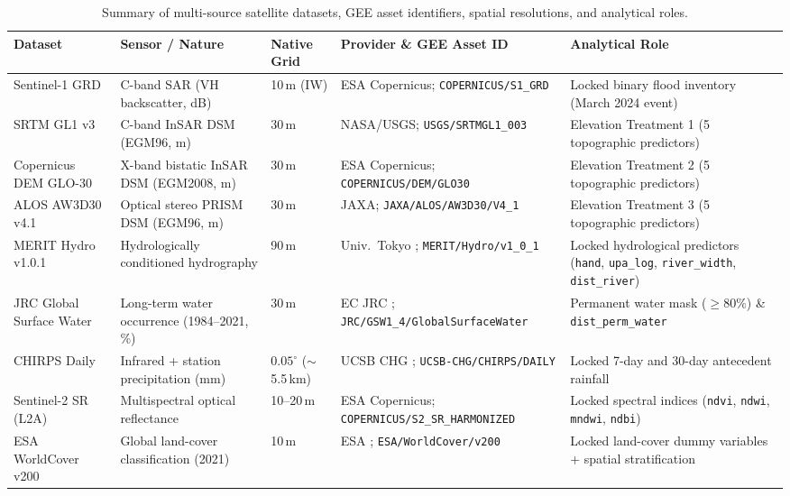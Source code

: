 \documentclass[11pt,twoside]{article}
\begin{document}
\begin{table}[!htbp]
\small
\centering
\caption{Summary of multi-source satellite datasets, GEE asset identifiers, spatial resolutions, and analytical roles.}
\label{tab:data-sources}
\begin{adjustbox}{max width=\textwidth}
\begin{tabular}{>{\raggedright}p{2.7cm} >{\raggedright}p{2.8cm} >{\raggedright}p{1.6cm} >{\raggedright}p{4.3cm} >{\raggedright\arraybackslash}p{3.4cm}}
\toprule
\textbf{Dataset} & \textbf{Sensor / Nature} & \textbf{Native Grid} & \textbf{Provider \& GEE Asset ID} & \textbf{Analytical Role} \\
\midrule
Sentinel-1 GRD & C-band SAR (VH backscatter, dB) & 10\,m (IW) & ESA Copernicus; \texttt{COPERNICUS/\allowbreak S1\_GRD} & Locked binary flood inventory (March 2024 event) \\
SRTM GL1 v3 & C-band InSAR DSM (EGM96, m) & 30\,m & NASA/USGS; \texttt{USGS/\allowbreak SRTMGL1\_003} & Elevation Treatment 1 (5 topographic predictors) \\
Copernicus DEM GLO-30 & X-band bistatic InSAR DSM (EGM2008, m) & 30\,m & ESA Copernicus; \texttt{COPERNICUS/\allowbreak DEM/\allowbreak GLO30} & Elevation Treatment 2 (5 topographic predictors) \\
ALOS AW3D30 v4.1 & Optical stereo PRISM DSM (EGM96, m) & 30\,m & JAXA; \texttt{JAXA/\allowbreak ALOS/\allowbreak AW3D30/\allowbreak V4\_1} & Elevation Treatment 3 (5 topographic predictors) \\
MERIT Hydro v1.0.1 & Hydrologically conditioned hydrography & 90\,m & Univ.\ Tokyo \cite{yamazaki2019}; \texttt{MERIT/\allowbreak Hydro/\allowbreak v1\_0\_1} & Locked hydrological predictors (\texttt{hand}, \texttt{upa\_log}, \texttt{river\_width}, \texttt{dist\_river}) \\
JRC Global Surface Water & Long-term water occurrence (1984--2021, \%) & 30\,m & EC JRC \cite{pekel2016}; \texttt{JRC/\allowbreak GSW1\_4/\allowbreak Global\allowbreak SurfaceWater} & Permanent water mask ($\ge 80\%$) \& \texttt{dist\_perm\_water} \\
CHIRPS Daily & Infrared + station precipitation (mm) & $0.05^\circ$ ($\sim$5.5\,km) & UCSB CHG \cite{funk2015}; \texttt{UCSB-CHG/\allowbreak CHIRPS/\allowbreak DAILY} & Locked 7-day and 30-day antecedent rainfall \\
Sentinel-2 SR (L2A) & Multispectral optical reflectance & 10--20\,m & ESA Copernicus; \texttt{COPERNICUS/\allowbreak S2\_SR\_\allowbreak HARMONIZED} & Locked spectral indices (\texttt{ndvi}, \texttt{ndwi}, \texttt{mndwi}, \texttt{ndbi}) \\
ESA WorldCover v200 & Global land-cover classification (2021) & 10\,m & ESA \cite{zanaga2021}; \texttt{ESA/\allowbreak WorldCover/\allowbreak v200} & Locked land-cover dummy variables + spatial stratification \\
\bottomrule
\end{tabular}
\end{adjustbox}
\end{table}
\end{document}

